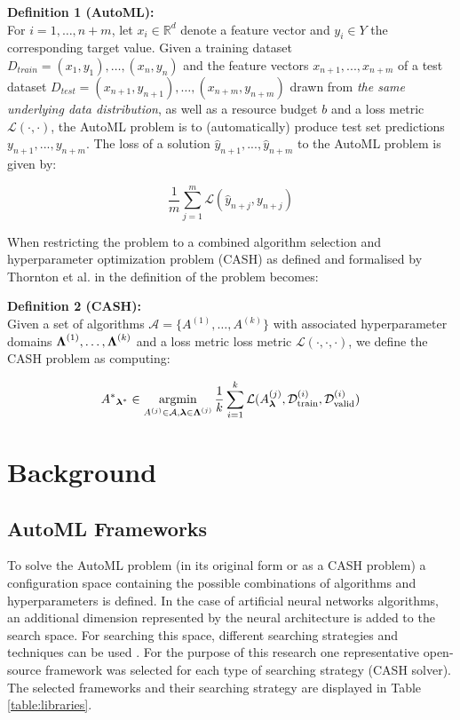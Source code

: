 \documentclass{sig-alternate-br}
\begin{document}
\textbf{Definition 1 (AutoML):} 
\\ For $i = 1, \dots , n + m$, let $x_i \in \mathbb{R}^d$ denote a feature vector and $y_i \in Y$ the corresponding target value. Given a training dataset $D_{train} = {(x_1, y_1),\dots , (x_{n}, y_{n})}$ and
the feature vectors $x_{n+1}, . . . , x_{n+m}$ of a test dataset $D_{test} = {(x_{n+1}, y_{n+1}), \dots ,(x_{n+m}, y_{n+m})}$
drawn from \textit{the same underlying data distribution}, as well as a resource budget $b$ and a loss metric
$\mathcal{L}(\cdot, \cdot)$, the AutoML problem is to (automatically) produce test set predictions $y_{n+1}, . . . , y_{n+m}$. The
loss of a solution $\hat{y}_{n+1}, . . . , \hat{y}_{n+m}$ to the AutoML problem is given by:

\begin{equation}
   \frac{1}{m} \sum_{j=1}^{m} \mathcal{L}( \hat{y}_{n+j},  {y}_{n+j})
\end{equation}

When restricting the problem to a combined algorithm selection and hyperparameter optimization problem (CASH) as defined and formalised by Thornton et al. in \cite{thornton2013autoweka} the definition of the problem becomes:

\textbf{Definition 2 (CASH):}
\\ Given a set of algorithms $\mathcal{A} = \{A^{(1)}, \dots, A^{(k)}\}$ with associated hyperparameter domains ${\boldsymbol{\Lambda}}^{(1)}, \dots, {\boldsymbol{\Lambda}}^{(k)}$ and a loss metric loss metric $\mathcal{L}(\cdot, \cdot, \cdot)$, we define the CASH problem as computing:

\begin{equation}
{A^*}_{\vlambda^*} \in \argmin_{A^{(j)} \in \mathcal{A}, \vlambda \in \vLambda^{(j)}} \frac{1}{k}  \sum_{i=1}^{k} \mathcal{L}(A^{(j)}_\vlambda, \mathcal{D}_{\text{train}}^{(i)}, \mathcal{D}_{\text{valid}}^{(i)})
\end{equation}

\section{Background}

\subsection{AutoML Frameworks}
To solve the AutoML problem (in its original form or as a CASH problem) a configuration space containing the possible combinations of algorithms and hyperparameters is defined. In the case of artificial neural networks algorithms, an additional dimension represented by the neural architecture is added to the search space. For searching this space, different searching strategies and techniques can be used \cite{truong2019towards}. For the purpose of this research one representative open-source framework \cite{gijsbers2019open} was selected for each type of searching strategy (CASH solver). The selected frameworks and their searching strategy are displayed in Table \ref{table:libraries}.
\end{document}
